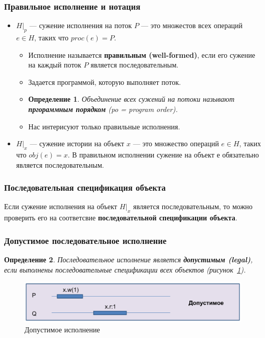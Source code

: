 \documentclass[10pt,a4paper,oneside,titlepage]{article}
\theoremstyle{plain}
\theoremstyle{defenition}
\newtheorem*{defenition}{Определение}
\begin{document}
\subsubsection{Правильное исполнение и нотация}
\begin{itemize}
	\item $H|_p$ --- сужение исполнения на поток $P$ --- это множестов всех операций $e\in H$, таких что $proc(e)=P$.
	\begin{itemize}
		\item Исполнение называется {\bfseries правильным (well-formed)}, если его сужение на каждый поток $P$ является последовательным.
		\item Задается программой, которую выполняет поток.
		\item \begin{defenition}
			Объединение всех сужений на потоки называют {\bfseries пргораммным порядком} (po = program order).
		\end{defenition}
	    \item Нас интерисуют только правильные исполнения.
	\end{itemize}
    \item $H|_x$ --- сужение истории на объект $x$ --- это множество операций $e\in H$, таких что $obj(e)=x$. В правильном исполнении сужение на объект е обязательно является последовательным.
\end{itemize}

\subsubsection{Последовательная спецификация объекта}
Если сужение исполнения на объект $H|_x$ является последовательным, то можно проверить его на соответсвие {\bfseries последовательной спецификации объекта}.

\subsubsection{Допустимое последовательное исполнение}
\begin{defenition}
	Последовательное исполнение является {\bfseries допустимым (legal)}, если выполнены последовательные спецификации всех объектов (рисунок~\ref{fig:model7}).
\end{defenition}

\begin{figure}[h!]
	\centering
	\includegraphics[width=0.5\linewidth]{pictures/Model7}
	\caption{Допустимое исполнение}
	\label{fig:model7}
\end{figure}
\end{document}
